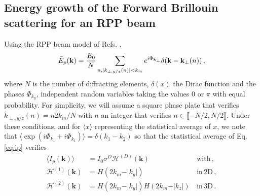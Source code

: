 \documentclass[
 reprint,
 amsmath,amssymb,
 aps,
]{revtex4-1}
\begin{document}
\begin{widetext}
 \subsection{Energy growth of the Forward Brillouin scattering for an RPP beam }
 Using the  RPP  beam model of Refs. \cite[]{POF_Schmitt_88,POF_Rose_93},
 \begin{align}
 \Bar{E}_p(\mathbf{k}) = \frac{E_0}{N} \sum_{n,\vert k_{\perp,y/z}(n)\vert<k_m } e^{i\Phi_{\mathbf{k}_\perp}}\delta(\mathbf{k}  - \mathbf{k}_\perp(n))\, , \label{eq:erpp}
 \end{align}
 where  $N$ is the number of diffracting elements, 
 $\delta(x)$ the Dirac function and the phases $\Phi_{k_y}$,  independent random variables taking the values $0$ or $\pi$ with equal probability.
 For simplicity, we will assume a square phase plate that verifies $k_{\perp,y/z}(n) = n2k_m/N$ with $n$ an integer that verifies $n\in \llbracket - N/2 ,N/2 \rrbracket$. 
 Under these conditions, and for $\langle x\rangle$ representing the statistical average of $x$,  we note   that $\langle\exp(i\Phi_{k_1}+i\Phi_{k_1})\rangle=\delta(k_1-k_2) $ so that  the statistical average  of Eq. \eqref{eq:ip} verifies
   \begin{align}
   \langle I_p(\mathbf{k})\rangle &= I_0 \sigma ^D \mathcal{H}^{(D)}(\mathbf{k})  &\,  \mathrm{with} \, ,\\ 
   \mathcal{H}^{(1)}(\mathbf{k}) &= H(2k_m - \vert k_y \vert ) &\,  \mathrm{in}\, \mathrm{2D} \, ,\\ 
    \mathcal{H}^{(2)}(\mathbf{k}) &=   H(2k_m - \vert k_y \vert ) H(2k_m - \vert k_z \vert ) &\,  \mathrm{in}\, \mathrm{3D} \, .

\end{align}
\end{widetext}
\end{document}
